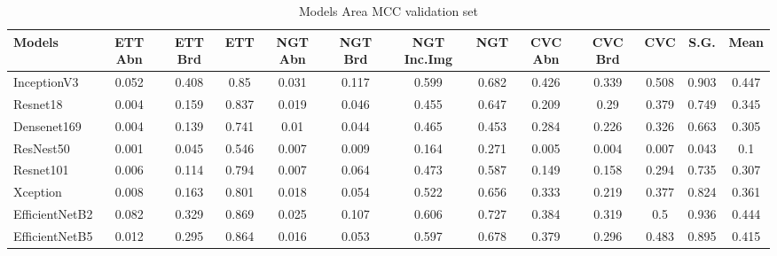 \documentclass[journal, a4paper]{IEEEtran}
\begin{document}
\begin{table}[ht]
	\bigskip
	\begin{minipage}{\linewidth}
		\centering
		\begin{tabular}{||l c c c c c c c c c c c c||}
			\hline
			Models         & ETT Abn & ETT Brd & ETT   & NGT Abn & NGT Brd & NGT Inc.Img & NGT   & CVC Abn & CVC Brd & CVC   & S.G.  & Mean  \\ [0.5ex] \hline\hline
			InceptionV3    & 0.052   & 0.408   & 0.85  & 0.031   & 0.117   & 0.599       & 0.682 & 0.426   & 0.339   & 0.508 & 0.903 & 0.447 \\ \hline
			Resnet18       & 0.004   & 0.159   & 0.837 & 0.019   & 0.046   & 0.455       & 0.647 & 0.209   & 0.29    & 0.379 & 0.749 & 0.345 \\ \hline
			Densenet169    & 0.004   & 0.139   & 0.741 & 0.01    & 0.044   & 0.465       & 0.453 & 0.284   & 0.226   & 0.326 & 0.663 & 0.305 \\ \hline
			ResNest50      & 0.001   & 0.045   & 0.546 & 0.007   & 0.009   & 0.164       & 0.271 & 0.005   & 0.004   & 0.007 & 0.043 & 0.1   \\ \hline
			Resnet101      & 0.006   & 0.114   & 0.794 & 0.007   & 0.064   & 0.473       & 0.587 & 0.149   & 0.158   & 0.294 & 0.735 & 0.307 \\ \hline
			Xception       & 0.008   & 0.163   & 0.801 & 0.018   & 0.054   & 0.522       & 0.656 & 0.333   & 0.219   & 0.377 & 0.824 & 0.361 \\ \hline
			EfficientNetB2 & 0.082   & 0.329   & 0.869 & 0.025   & 0.107   & 0.606       & 0.727 & 0.384   & 0.319   & 0.5   & 0.936 & 0.444 \\ \hline
			EfficientNetB5 & 0.012   & 0.295   & 0.864 & 0.016   & 0.053   & 0.597       & 0.678 & 0.379   & 0.296   & 0.483 & 0.895 & 0.415 \\ [0.5ex] \hline
		\end{tabular}
		\label{tab:models_amcc}
		\caption{Models Area MCC validation set}
	\end{minipage}
			  

\end{table}
\end{document}
